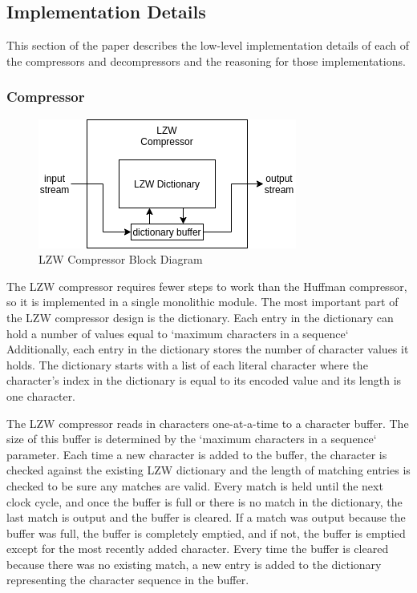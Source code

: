 \documentclass[doublespace,nopageskip]{VTthesis}
\begin{document}
\subsection{Implementation Details}\label{se:lzw_implementation_details}
This section of the paper describes the low-level implementation details of each of the compressors and decompressors and the reasoning for those implementations.

\subsubsection{Compressor}\label{sss:lzw_compressor_implementation}

\begin{figure}[htb]
	\centering
	\includegraphics[scale=1]{LZW Compressor.png}
	\caption{LZW Compressor Block Diagram}
	\label{fig:lzw_compressor_block_diagram}
\end{figure}

The LZW compressor requires fewer steps to work than the Huffman compressor, so it is implemented in a single monolithic module. The most important part of the LZW compressor design is the dictionary. Each entry in the dictionary can hold a number of values equal to `maximum characters in a sequence` Additionally, each entry in the dictionary stores the number of character values it holds. The dictionary starts with a list of each literal character where the character's index in the dictionary is equal to its encoded value and its length is one character.

The LZW compressor reads in characters one-at-a-time to a character buffer. The size of this buffer is determined by the `maximum characters in a sequence` parameter. Each time a new character is added to the buffer, the character is checked against the existing LZW dictionary and the length of matching entries is checked to be sure any matches are valid. Every match is held until the next clock cycle, and once the buffer is full or there is no match in the dictionary, the last match is output and the buffer is cleared. If a match was output because the buffer was full, the buffer is completely emptied, and if not, the buffer is emptied except for the most recently added character. Every time the buffer is cleared because there was no existing match, a new entry is added to the dictionary representing the character sequence in the buffer.
\end{document}
